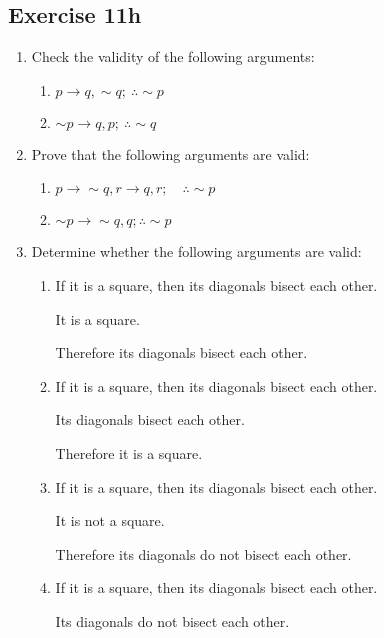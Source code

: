 \documentclass{report}
\begin{document}
\subsection*{Exercise 11h}
\begin{enumerate}
    \item Check the validity of the following arguments:
          \begin{enumerate}
              \item $p \rightarrow q, \sim q ;\ \therefore \sim p$
              \item $\sim p \rightarrow q, p ;\ \therefore \sim q$
          \end{enumerate}

    \item Prove that the following arguments are valid:
          \begin{enumerate}
              \item $p \rightarrow \sim q, r \rightarrow q, r ; \quad \therefore \sim p$
              \item $\sim p \rightarrow \sim q, q ; \therefore \sim p$
          \end{enumerate}

    \item Determine whether the following arguments are valid:
          \begin{enumerate}
              \item If it is a square, then its diagonals bisect each other.

                    It is a square.

                    Therefore its diagonals bisect each other.

              \item If it is a square, then its diagonals bisect each other.

                    Its diagonals bisect each other.

                    Therefore it is a square.

              \item If it is a square, then its diagonals bisect each other.

                    It is not a square.

                    Therefore its diagonals do not bisect each other.

              \item If it is a square, then its diagonals bisect each other.

                    Its diagonals do not bisect each other.


\end{enumerate}
\end{enumerate}
\end{document}
